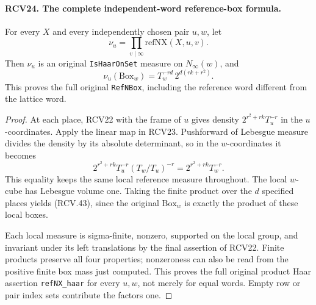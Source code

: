 \paragraph{RCV24. The complete independent-word reference-box formula.}
\label{claim:RCV24}
For every \(X\) and every independently chosen pair \(u,w\),
let
\[
 \nu_u=\prod_{v\mid\infty}\mathrm{refNX}(X,u,v).
\]
Then \(\nu_u\) is an original \texttt{IsHaarOnSet} measure
on \(N_\infty(w)\), and
\[
       \nu_u(\mathrm{Box}_w)
                 =T_w^{-rd}\,2^{d(rk+r^2)}.
\tag{RCV.43}
\]
This proves the full original \texttt{RefNBox}, including the
reference word different from the lattice word.
\begin{proof}
At each place, RCV22 with the frame of \(u\) gives density
\(2^{r^2+rk}T_u^{-r}\) in the \(u\)-coordinates.  Apply
the linear map in RCV23.  Pushforward of Lebesgue measure divides
the density by its absolute determinant, so in the
\(w\)-coordinates it becomes
\[
 2^{r^2+rk}T_u^{-r}(T_w/T_u)^{-r}
                              =2^{r^2+rk}T_w^{-r}.
\]
This equality keeps the same local reference measure throughout.
The local \(w\)-cube has Lebesgue volume one.  Taking the finite
product over the \(d\) specified places yields (RCV.43), since
the original \(\mathrm{Box}_w\) is exactly the product of these
local boxes.

Each local measure is sigma-finite, nonzero, supported on the local
group, and invariant under its left translations by the final
assertion of RCV22.  Finite products preserve all four properties;
nonzeroness can also be read from the positive finite box mass just
computed.  This proves the full original product Haar assertion
\texttt{refNX\_haar} for every \(u,w\), not merely for equal
words.  Empty row or pair index sets contribute the factors one.
\end{proof}

